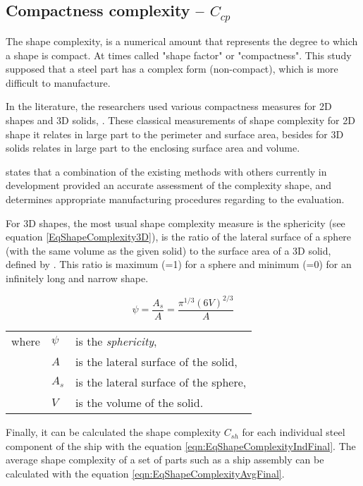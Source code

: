 \subsection{Compactness complexity -- $C_{cp}$}
The shape complexity, is a numerical amount that represents the degree to which a shape is compact. At times called "shape factor" or "compactness". This study supposed that a steel part has a complex form (non-compact), which is more difficult to manufacture.

In the literature, the researchers used various compactness measures for 2D shapes and 3D solids, \cite{valentan2008}. These classical measurements of shape complexity for 2D shape it relates in large part to the perimeter and surface area, besides for 3D solids relates in large part to the enclosing surface area and volume.

\cite{valentan2008} states that a combination of the existing methods with others currently in development provided an accurate assessment of the complexity shape, and determines appropriate manufacturing procedures regarding to the evaluation.

For 3D shapes, the most usual shape complexity measure is the sphericity (see equation \ref{EqShapeComplexity3D}), is the ratio of the lateral surface of a sphere (with the same volume as the given solid) to the surface area of a 3D solid, defined by \cite{wadell1935volume}. %
This ratio is maximum (=1) for a sphere and minimum (=0) for an infinitely long and narrow shape.

\begin{equation}
\psi = \frac{A_s}{A}= \frac{\pi^{1/3}(6V)^{2/3}}{A}
\label{eqn:EqShapeComplexity3D}
\end{equation}

\begin{tabular}{l l l}
where		& $\psi$ 	& is the \textit{sphericity},\\
				& $A$		& is the lateral surface of the solid,\\
				& $A_s$	& is the lateral surface of the sphere,\\
				& $V$		& is the volume of the solid.
\end{tabular}

Finally, it can be calculated the shape complexity $C_{sh}$ for each individual steel component of the ship with the equation \ref{eqn:EqShapeComplexityIndFinal}. The average shape complexity of a set of parts such as a ship assembly can be calculated  with the equation \ref{eqn:EqShapeComplexityAvgFinal}.
	
